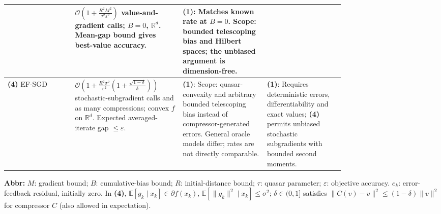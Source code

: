 \begin{table}[tp]
\begin{threeparttable}
\begin{tabularx}{\linewidth}{@{}>{\raggedright\arraybackslash}p{0.20\linewidth}>{\raggedright\arraybackslash}p{0.32\linewidth}>{\raggedright\arraybackslash}p{0.25\linewidth}>{\raggedright\arraybackslash}X@{}}
& $\mathcal{O}\!\left(1+\frac{R^2M^2}{\tau^2\varepsilon^2}\right)$ value-and-gradient calls; $B=0$, $\mathbb R^d$. Mean-gap bound gives best-value accuracy.
& \textbf{(1)}: Matches known rate at $B=0$. Scope: bounded telescoping bias and Hilbert spaces; the unbiased argument is dimension-free.
& \\
\midrule
\textbf{(4)} EF-SGD \citep[Thm.~III]{qsbKarimireddy2019}
& $\mathcal{O}\!\left(1+\frac{R^2\sigma^2}{\varepsilon^2}\left(1+\frac{\sqrt{1-\delta}}{\delta}\right)\right)$ stochastic-subgradient calls and as many compressions; convex $f$ on $\mathbb R^d$. Expected averaged-iterate gap $\le\varepsilon$.
& \textbf{(1)}: Scope: quasar-convexity and arbitrary bounded telescoping bias instead of compressor-generated errors. General oracle models differ; rates are not directly comparable.
& \textbf{(1)}: Requires deterministic errors, differentiability and exact values; \textbf{(4)} permits unbiased stochastic subgradients with bounded second moments. \\
\bottomrule
\end{tabularx}
\begin{tablenotes}[flushleft]\footnotesize
\item[] \textbf{Abbr:} $M$: gradient bound; $B$: cumulative-bias bound; $R$: initial-distance bound; $\tau$: quasar parameter; $\varepsilon$: objective accuracy. $e_k$: error-feedback residual, initially zero. In \textbf{(4)}, $\mathbb E[g_k\mid x_k]\in\partial f(x_k)$, $\mathbb E[\|g_k\|^2\mid x_k]\le\sigma^2$; $\delta\in(0,1]$ satisfies $\|C(v)-v\|^2\le(1-\delta)\|v\|^2$ for compressor $C$ (also allowed in expectation).
\end{tablenotes}
\end{threeparttable}
\end{table}
\clearpage
